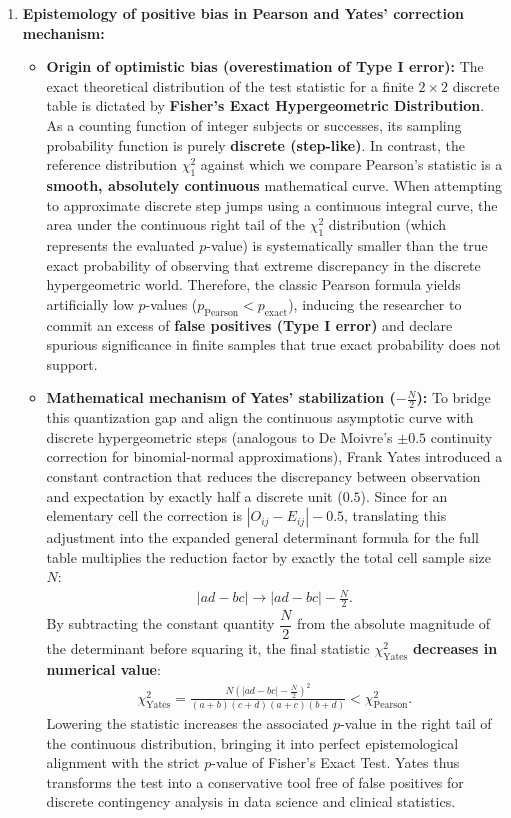 \begin{solproblema}
\begin{enumerate}
		\item \textbf{Epistemology of positive bias in Pearson and Yates' correction mechanism:}
		\begin{itemize}
			\item \textbf{Origin of optimistic bias (overestimation of Type I error):}
			The exact theoretical distribution of the test statistic for a finite $2 \times 2$ discrete table is dictated by \textbf{Fisher's Exact Hypergeometric Distribution}. As a counting function of integer subjects or successes, its sampling probability function is purely \textbf{discrete (step-like)}.
			In contrast, the reference distribution $\chi^2_1$ against which we compare Pearson's statistic is a \textbf{smooth, absolutely continuous} mathematical curve.
			When attempting to approximate discrete step jumps using a continuous integral curve, the area under the continuous right tail of the $\chi^2_1$ distribution (which represents the evaluated $p$-value) is systematically smaller than the true exact probability of observing that extreme discrepancy in the discrete hypergeometric world. Therefore, the classic Pearson formula yields artificially low $p$-values ($p_{\text{Pearson}} < p_{\text{exact}}$), inducing the researcher to commit an excess of \textbf{false positives (Type I error)} and declare spurious significance in finite samples that true exact probability does not support.
			
			\item \textbf{Mathematical mechanism of Yates' stabilization ($-\frac{N}{2}$):}
			To bridge this quantization gap and align the continuous asymptotic curve with discrete hypergeometric steps (analogous to De Moivre's $\pm 0.5$ continuity correction for binomial-normal approximations), Frank Yates introduced a constant contraction that reduces the discrepancy between observation and expectation by exactly half a discrete unit ($0.5$).
			Since for an elementary cell the correction is $|O_{ij} - E_{ij}| - 0.5$, translating this adjustment into the expanded general determinant formula for the full table multiplies the reduction factor by exactly the total cell sample size $N$:
			\begin{align}
				|ad - bc| \longrightarrow |ad - bc| - \frac{N}{2}.
			\end{align}
			By subtracting the constant quantity $\dfrac{N}{2}$ from the absolute magnitude of the determinant before squaring it, the final statistic $\chi^2_{\text{Yates}}$ \textbf{decreases in numerical value}:
			\begin{align}
				\chi^2_{\text{Yates}} = \frac{N \left( |ad - bc| - \frac{N}{2} \right)^2}{(a+b)(c+d)(a+c)(b+d)} < \chi^2_{\text{Pearson}}.
			\end{align}
			Lowering the statistic increases the associated $p$-value in the right tail of the continuous distribution, bringing it into perfect epistemological alignment with the strict $p$-value of Fisher's Exact Test. Yates thus transforms the test into a conservative tool free of false positives for discrete contingency analysis in data science and clinical statistics.
		\end{itemize}
	\end{enumerate}
\end{solproblema}
